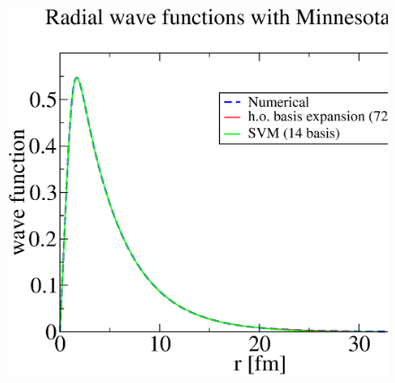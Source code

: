 \documentclass[12pt,a4paper,titlepage]{jarticle}
\begin{document}
\begin{figure}[H]
\begin{center}
\includegraphics[width=140mm,height=110mm]{wave-fcts4.eps}
\end{center}
\end{figure}
\end{document}
